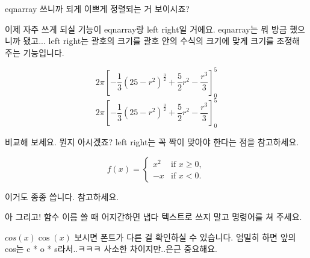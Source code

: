 \documentclass{article}
\begin{document}
eqnarray 쓰니까 되게 이쁘게 정렬되는 거 보이시죠?

이제 자주 쓰게 되실 기능이 eqnarray랑 left right일 거에요. eqnarray는 뭐 방금 했으니까 됐고...
left right는 괄호의 크기를 괄호 안의 수식의 크기에 맞게 크기를 조정해 주는 기능입니다.
    
\[ 2\pi [-\frac{1}{3}(25-r^2)^{\frac{3}{2}} + \frac{5}{2}r^2 - \frac{r^3}{3}]_{0}^{5} \]
\[ 2\pi \left[ -\frac{1}{3}(25-r^2)^{\frac{3}{2}} + \frac{5}{2}r^2 - \frac{r^3}{3} \right]_{0}^{5} \]

비교해 보세요. 뭔지 아시겠죠?
left right는 꼭 짝이 맞아야 한다는 점을 참고하세요.

\[
f(x) =
\begin{cases} 
x^2 & \text{if } x \geq 0, \\
-x  & \text{if } x < 0.
\end{cases}
\]

이거도 종종 씁니다. 참고하세요.

아 그리고! 함수 이름 쓸 때 어지간하면 냅다 텍스트로 쓰지 말고 명령어를 쳐 주세요.

\(cos(x) \cos(x)\) 보시면 폰트가 다른 걸 확인하실 수 있습니다. 엄밀히 하면 앞의 cos는 c * o * s라서..ㅋㅋㅋ 사소한 차이지만..은근 중요해요.
\end{document}
